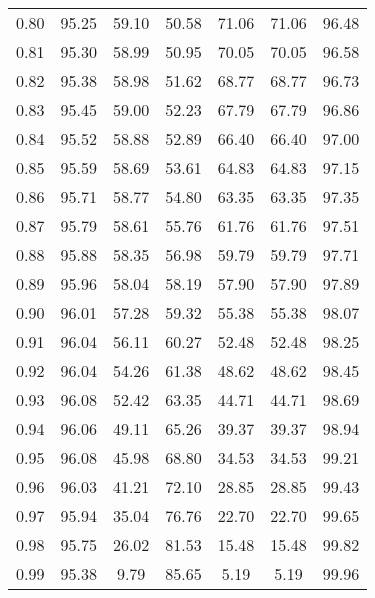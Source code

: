 \begin{tabular}{|c|c|c|c|c|c|c|}
      0.80 &     95.25 &     59.10 &      50.58 &   71.06 &      71.06 &         96.48 \\
      0.81 &     95.30 &     58.99 &      50.95 &   70.05 &      70.05 &         96.58 \\
      0.82 &     95.38 &     58.98 &      51.62 &   68.77 &      68.77 &         96.73 \\
      0.83 &     95.45 &     59.00 &      52.23 &   67.79 &      67.79 &         96.86 \\
      0.84 &     95.52 &     58.88 &      52.89 &   66.40 &      66.40 &         97.00 \\
      0.85 &     95.59 &     58.69 &      53.61 &   64.83 &      64.83 &         97.15 \\
      0.86 &     95.71 &     58.77 &      54.80 &   63.35 &      63.35 &         97.35 \\
      0.87 &     95.79 &     58.61 &      55.76 &   61.76 &      61.76 &         97.51 \\
      0.88 &     95.88 &     58.35 &      56.98 &   59.79 &      59.79 &         97.71 \\
      0.89 &     95.96 &     58.04 &      58.19 &   57.90 &      57.90 &         97.89 \\
      0.90 &     96.01 &     57.28 &      59.32 &   55.38 &      55.38 &         98.07 \\
      0.91 &     96.04 &     56.11 &      60.27 &   52.48 &      52.48 &         98.25 \\
      0.92 &     96.04 &     54.26 &      61.38 &   48.62 &      48.62 &         98.45 \\
      0.93 &     96.08 &     52.42 &      63.35 &   44.71 &      44.71 &         98.69 \\
      0.94 &     96.06 &     49.11 &      65.26 &   39.37 &      39.37 &         98.94 \\
      0.95 &     96.08 &     45.98 &      68.80 &   34.53 &      34.53 &         99.21 \\
      0.96 &     96.03 &     41.21 &      72.10 &   28.85 &      28.85 &         99.43 \\
      0.97 &     95.94 &     35.04 &      76.76 &   22.70 &      22.70 &         99.65 \\
      0.98 &     95.75 &     26.02 &      81.53 &   15.48 &      15.48 &         99.82 \\
      0.99 &     95.38 &      9.79 &      85.65 &    5.19 &       5.19 &         99.96 \\
\bottomrule
\end{tabular}
